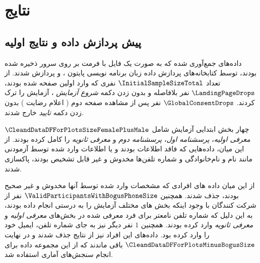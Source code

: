 \chapter{نتایج}
\label{chap:results}

\section{پیش پردازش داده و نتایج اولیه}
داده‌های جمع‌آوری شده که به صورت یک فایل با فرمت 
بر روی سرور ذخیره شده بودند، توسط کتابخانه‌های پردازش داده زبان برنامه نویسی پایتون 
\!،
 و
پردازش شدند. از تعداد $\InitialSampleSizeTotal$
نفری که وارد اولین صفحه شده بودند،
$\LandingPageDrops$
نفر بلافاصله و بدون زدن دکمه 
\textit{شروع آزمایش}
\!، 
آزمایش را ترک کردند.
$\GlobalConsentDrops$
نفر پس از مشاهده صفحه دوم
\!(
    اعلام رضایت
    ) 
    بدون زدن دکمه
    \textit{تایید}
    خارج شدند.
    
$\CleandDataDFForPlotsSizeFemalePlusMale$
چهار بخش ابتدایی آزمایش شامل
\textit{معرفی اولیه}،
\textit{پرسشنامه اول}،
\textit{پرسشنامه دوم} و
\textit{معرفی ثانویه}
را کامل کرده بودند.
از این میان، داده‌هایی که فاقد اطلاعات بودند و یا اطلاعات وارد شده توسط آزمودنی
مانند نام و نام‌خانوادگی و شماره تلفن‌ها مخدوش و غیر قابل تشخیص بودند، پاکسازی شدند. 

از این میان داده های افرادی که مشخصات وارد شده توسط آنها مخدوش و غیر صحیح 
بودند، جذف شدند. همچنین
$\ValidParticipantsWithBogusPhoneSize$
 نفر  از شرکت کنندگان با وجود اینکه 
بخش های مختلف آزمایش را به درستی انجام داده بودند، به این دلیل که شماره تلفن نامعتر
برای فرد معرفی شده در بخش‌های 
\textit{معرفی اولیه}
و
\textit{معرفی ثانویه}
وارد کرده بودند. همچنین
$1$
نفر دیگر نیز به جای شماره تلفن، ایمیل خود را وارد کرده بود. داده‌های این افراد نیز از نتایج جذف شدند
و در نهایت 
$\CleandDataDFForPlotsMinusBogusSize$
باقی ماندند که از این مجموعه داده برای انجام سنجش‌های آماری استفاده شد.

